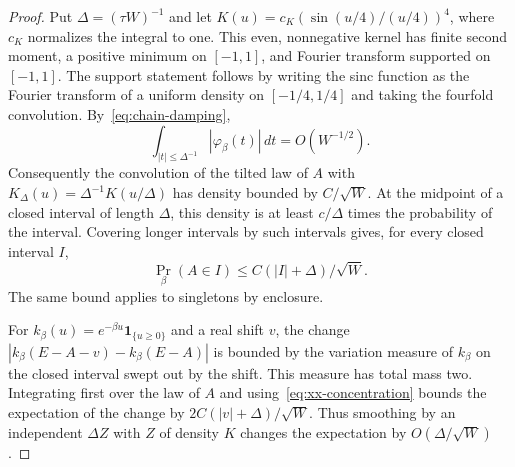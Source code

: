 \begin{proof}
Put $\Delta=(\tau W)^{-1}$ and let $K(u)=c_K(\sin(u/4)/(u/4))^4$,
where $c_K$ normalizes the integral to one. This even, nonnegative
kernel has finite second moment, a positive minimum on $[-1,1]$, and
Fourier transform supported on $[-1,1]$. The support statement follows
by writing the sinc function as the Fourier transform of a uniform
density on $[-1/4,1/4]$ and taking the fourfold convolution.
By~\eqref{eq:chain-damping},
\[
 \int_{|t|\le\Delta^{-1}}|\varphi_\beta(t)|\,dt=O(W^{-1/2}).
\]
Consequently the convolution of the tilted law of $A$ with
$K_\Delta(u)=\Delta^{-1}K(u/\Delta)$ has density bounded by $C/\sqrt W$.
At the midpoint of a closed interval of length $\Delta$, this density
is at least $c/\Delta$ times the probability of the interval. Covering
longer intervals by such intervals gives, for every closed interval $I$,
\begin{equation}\label{eq:xx-concentration}
 \Pr_\beta(A\in I)\le C(|I|+\Delta)/\sqrt W.
\end{equation}
The same bound applies to singletons by enclosure.

For $k_\beta(u)=e^{-\beta u}\mathbf1_{\{u\ge0\}}$ and a real shift $v$,
the change $|k_\beta(E-A-v)-k_\beta(E-A)|$ is bounded by the variation
measure of $k_\beta$ on the closed interval swept out by the shift.
This measure has total mass two. Integrating first over the law of $A$
and using~\eqref{eq:xx-concentration} bounds the expectation of the change
by $2C(|v|+\Delta)/\sqrt W$. Thus smoothing by an independent
$\Delta Z$ with $Z$ of density $K$ changes the expectation by
$O(\Delta/\sqrt W)$.


\end{proof}
